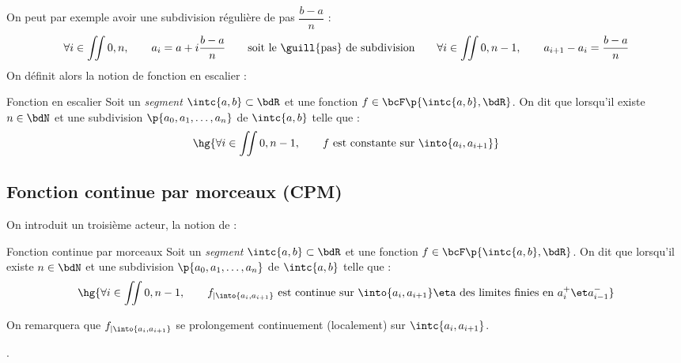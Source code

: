 \documentclass[a4paper,french,bookmarks]{article}
\begin{document}
    
    On peut par exemple avoir une subdivision régulière de pas $\dfrac{b-a}{n}$ :
    \[ \forall i \in \iint{0, n},\qquad a_i = a + i\dfrac{b-a}{n} \qquad\text{soit le \guill{pas} de subdivision}\qquad\forall i \in \iint{0, n-1},\qquad  a_{i+1}-a_i = \dfrac{b-a}{n}\]
    On définit alors la notion de fonction en escalier :
    
    \begin{definition}{Fonction en escalier}{}
            Soit un \textit{segment} $\intc{a, b} \subset \bdR$ et une fonction $f \in \bcF\p{\intc{a, b}, \bdR}$. On dit que  lorsqu'il existe $n \in \bdN$ et une subdivision $\p{a_0, a_1, \dots, a_n}$ de $\intc{a, b}$ telle que :
            \[ \hg{ \forall i \in \iint{0, n-1},\qquad f \ \text{est constante sur} \ \into{a_i, a_{i+1}} }\]
    \end{definition}
    
    \subsection{Fonction continue par morceaux (CPM)}
    
    On introduit un troisième acteur, la notion de  :
    \begin{definition}{Fonction continue par morceaux}{}
        Soit un \textit{segment} $\intc{a, b} \subset \bdR$ et une fonction $f \in \bcF\p{\intc{a, b}, \bdR}$. On dit que  lorsqu'il existe $n \in \bdN$ et une subdivision $\p{a_0, a_1, \dots, a_n}$ de $\intc{a, b}$ telle que :
        \[ \hg{ \forall i \in \iint{0, n-1},\qquad f_{\vert \into{a_i, a_{i+1}}} \ \text{est continue sur} \ \into{a_i, a_{i+1}} \et \text{a des limites finies en} \ a_i^+ \et a_{i-1}^-}\]
    \end{definition}
    
    On remarquera que $f_{\vert \into{a_i, a_{i+1}}}$ se prolongement continuement (localement) sur $\intc{a_i, a_{i+1}}$. 
    
    \begin{warning}{}{}
        .
    \end{warning}
    
\end{document}
